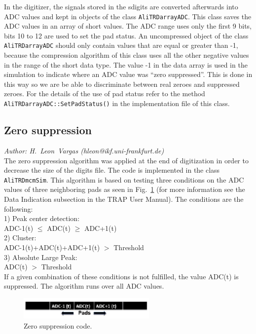 \documentclass{alicetdr}
\begin{document}
In the digitizer, the signals stored in the sdigits are converted 
afterwards into ADC values and kept in objects of the class 
{\tt AliTRDarrayADC}.  This class saves the ADC values in an array of 
short values. The ADC range uses only the first 9 bits, bits 10 to 12 
are used to set the pad status.  An uncompressed object of the class 
{\tt AliTRDarrayADC} should only contain values that are equal or 
greater than -1, because the compression algorithm of this class uses 
all the other negative values in the range of the short data type. The 
value -1 in the data array is used in the simulation to indicate where 
an ADC value was ``zero suppressed''. This is done in this way so we 
are be able to discriminate between real zeroes and suppressed zeroes. 
For the details of the use of pad status refer to the method 
{\tt AliTRDarrayADC::SetPadStatus()} in the implementation file of this class.
%
\subsection{Zero suppression}
\label{DIGITS:zs}
%
{\it Author: H.~Leon~Vargas (hleon@ikf.uni-frankfurt.de)}
\smallskip
\\
%
The zero suppression algorithm was applied at the end of digitization
in order to decrease the size of the digits file. The code is implemented 
in the class {\tt AliTRDmcmSim}.  This algorithm is based on testing 
three conditions on the ADC values of three neighboring pads as seen 
in Fig.~\ref{FIG_DIG:zs} (for more information see the Data Indication 
subsection in the TRAP User Manual). The conditions are the following:\\

1) Peak center detection:\\

ADC-1(t) $\leq$ ADC(t) $\geq$ ADC+1(t)\\

2) Cluster:\\

ADC-1(t)+ADC(t)+ADC+1(t) $>$ Threshold\\

3) Absolute Large Peak:\\

ADC(t) $>$ Threshold\\

If a given combination of these conditions is not fulfilled, the value ADC(t) 
is suppressed. The algorithm runs over all ADC values.
%
\begin{figure}[htb]
\begin{center}
\includegraphics[width=0.60\textwidth]{plots/zsuppression.eps}
\end{center}
\caption{
Zero suppression code.
}
\label{FIG_DIG:zs}
\end{figure}
%
\end{document}
